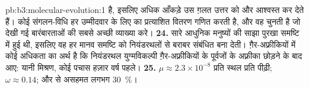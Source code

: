 \begin{solution}{pb:b3:molecular-evolution:1}
है, इसलिए अधिक आँकड़े उस ग़लत उत्तर को और आश्वस्त कर देते हैं। कोई
संगलन-विधि हर उम्मीदवार  के लिए  का प्रत्याशित
वितरण गणित करती है, और वह  चुनती है जो देखी गई बारंबारताओं की
सबसे अच्छी व्याख्या करे।
\textbf{24.}  सारे आधुनिक मनुष्यों की साझा पुरखा समष्टि
में हुई थी, इसलिए वह हर मानव समष्टि को नियंडरथलों से बराबर संबंधित बना
देती। ग़ैर-अफ़्रीकियों में कोई अधिकता का अर्थ है कि नियंडरथल
युग्मविकल्पी ग़ैर-अफ़्रीकियों के पूर्वजों के अफ़्रीका छोड़ने के बाद
आए: यानी मिश्रण, कोई पचास हज़ार वर्ष पहले।
\textbf{25.} $\mu \approx 2.3\times 10^{-8}$ प्रति स्थल प्रति पीढ़ी;
$\omega \approx 0.14$; और  से असहमत  लगभग
\qty{30}{\%}।
\end{solution}
